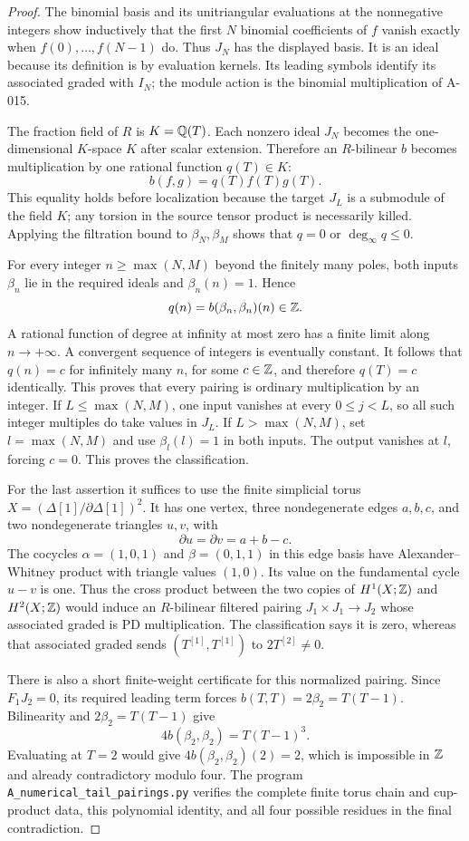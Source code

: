 \begin{proof}
The binomial basis and its unitriangular evaluations at the
nonnegative integers show inductively that the first $N$ binomial
coefficients of $f$ vanish exactly when $f(0),\ldots,f(N-1)$ do.
Thus $J_N$ has the displayed basis. It is an ideal because its
definition is by evaluation kernels. Its leading symbols identify
its associated graded with $I_N$; the module action is the binomial
multiplication of A-015.

The fraction field of $R$ is $K=\mathbb Q(T)$. Each nonzero ideal $J_N$
becomes the one-dimensional $K$-space $K$ after scalar extension.
Therefore an $R$-bilinear $b$ becomes multiplication by one rational
function $q(T)\in K$:
\[
                    b(f,g)=q(T)f(T)g(T).
\]
This equality holds before localization because the target $J_L$
is a submodule of the field $K$; any torsion in the source tensor
product is necessarily killed. Applying the filtration bound to
$\beta_N,\beta_M$ shows that $q=0$ or
$\deg_\infty q\leq0$.

For every integer $n\geq\max(N,M)$ beyond the finitely many poles,
both inputs $\beta_n$ lie in the required ideals and
$\beta_n(n)=1$. Hence
\[
              q(n)=b(\beta_n,\beta_n)(n)\in\mathbb Z.
\]
A rational function of degree at infinity at most zero has a finite
limit along $n\to+\infty$. A convergent sequence of integers is
eventually constant. It follows that $q(n)=c$ for infinitely many
$n$, for some $c\in\mathbb Z$, and therefore $q(T)=c$ identically.
This proves that every pairing is ordinary multiplication by an
integer. If $L\leq\max(N,M)$, one input vanishes at every
$0\leq j<L$, so all such integer multiples do take values in $J_L$.
If $L>\max(N,M)$, set $l=\max(N,M)$ and use
$\beta_l(l)=1$ in both inputs. The output vanishes at $l$, forcing
$c=0$. This proves the classification.

For the last assertion it suffices to use the finite simplicial
torus $X=(\Delta[1]/\partial\Delta[1])^2$. It has one vertex,
three nondegenerate edges $a,b,c$, and two nondegenerate triangles
$u,v$, with
\[
 \partial u=\partial v=a+b-c.
\]
The cocycles $\alpha=(1,0,1)$ and $\beta=(0,1,1)$ in this edge
basis have Alexander--Whitney product with triangle values $(1,0)$.
Its value on the fundamental cycle $u-v$ is one. Thus the cross
product between the two copies of $H^1(X;\mathbb Z)$ and $H^2(X;\mathbb Z)$
would induce an $R$-bilinear filtered pairing
$J_1\times J_1\to J_2$ whose associated graded is PD
multiplication. The classification says it is zero, whereas that
associated graded sends $(T^{[1]},T^{[1]})$ to $2T^{[2]}\ne0$.

There is also a short finite-weight certificate for this normalized
pairing. Since $F_1J_2=0$, its required leading term forces
$b(T,T)=2\beta_2=T(T-1)$. Bilinearity and
$2\beta_2=T(T-1)$ give
\[
       4b(\beta_2,\beta_2)=T(T-1)^3.
\]
Evaluating at $T=2$ would give $4b(\beta_2,\beta_2)(2)=2$, which
is impossible in $\mathbb Z$ and already contradictory modulo four.
The program \texttt{A\_numerical\_tail\_pairings.py} verifies the
complete finite torus chain and cup-product data, this polynomial
identity, and all four possible residues in the final contradiction.
\end{proof}

